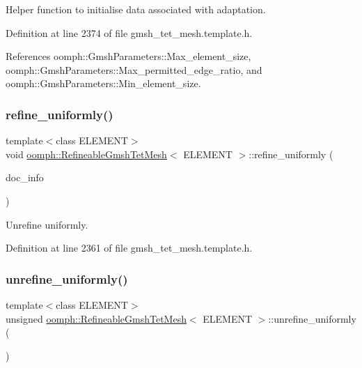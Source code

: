 Helper function to initialise data associated with adaptation. 



Definition at line 2374 of file gmsh\+\_\+tet\+\_\+mesh.\+template.\+h.



References oomph\+::\+Gmsh\+Parameters\+::\+Max\+\_\+element\+\_\+size, oomph\+::\+Gmsh\+Parameters\+::\+Max\+\_\+permitted\+\_\+edge\+\_\+ratio, and oomph\+::\+Gmsh\+Parameters\+::\+Min\+\_\+element\+\_\+size.

\mbox{\label{classoomph_1_1RefineableGmshTetMesh_a8d71e18a1181d79c475217cfab320674}} 
\subsubsection{\texorpdfstring{refine\+\_\+uniformly()}{refine\_uniformly()}}
{\footnotesize\ttfamily template$<$class E\+L\+E\+M\+E\+NT$>$ \\
void \hyperlink{classoomph_1_1RefineableGmshTetMesh}{oomph\+::\+Refineable\+Gmsh\+Tet\+Mesh}$<$ E\+L\+E\+M\+E\+NT $>$\+::refine\+\_\+uniformly (\begin{DoxyParamCaption}\item[{Doc\+Info \&}]{doc\+\_\+info }\end{DoxyParamCaption})\hspace{0.3cm}{\ttfamily [inline]}}



Unrefine uniformly. 



Definition at line 2361 of file gmsh\+\_\+tet\+\_\+mesh.\+template.\+h.

\mbox{\label{classoomph_1_1RefineableGmshTetMesh_aa243fd14b5f168f541e5451766a9f68d}} 
\subsubsection{\texorpdfstring{unrefine\+\_\+uniformly()}{unrefine\_uniformly()}}
{\footnotesize\ttfamily template$<$class E\+L\+E\+M\+E\+NT$>$ \\
unsigned \hyperlink{classoomph_1_1RefineableGmshTetMesh}{oomph\+::\+Refineable\+Gmsh\+Tet\+Mesh}$<$ E\+L\+E\+M\+E\+NT $>$\+::unrefine\+\_\+uniformly (\begin{DoxyParamCaption}{ }\end{DoxyParamCaption})\hspace{0.3cm}{\ttfamily [inline]}}



